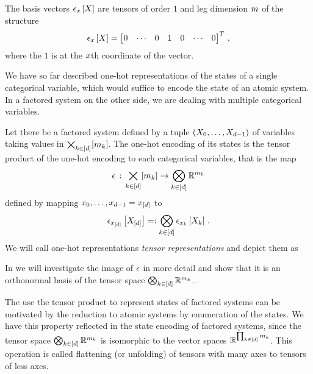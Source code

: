 The basis vectors $\epsilon_{x}\left[X\right]$ are tensors of order $1$ and leg dimension $m$ of the structure
\begin{align}
	\epsilon_{x}\left[X\right] = \begin{bmatrix}
	0 & \cdots & 0 & 1 & 0 & \cdots & 0
	\end{bmatrix}^T \, ,
\end{align}
where the $1$ is at the $x$th coordinate of the vector.

We have so far described one-hot representations of the states of a single categorical variable, which would suffice to encode the state of an atomic system.
In a factored system on the other side, we are dealing with multiple categorical variables.

\begin{definition}\label{def:oneHotEncoding}
	Let there be a factored system defined by a tuple $(X_{0},\ldots,X_{d-1})$ of variables taking values in $\bigtimes_{k\in[d]}[m_{k}]$.
	The one-hot encoding of its states is the tensor product of the one-hot encoding to each categorical variables, that is the map
		\[ \epsilon\,:\,\bigtimes_{k\in[d]}[m_{k}] \rightarrow  \bigotimes_{k\in[d]} \mathbb{R}^{m_{k}} \]
	defined by mapping $x_{0},\ldots,x_{d-1}=x_{[d]}$ to
	\begin{align*}
		 \epsilon_{x_{[d]}}\left[X_{[d]}\right]
		=: \bigotimes_{k\in[d]} \epsilon_{x_{k}}\left[X_{k}\right] \, .
	\end{align*}
	We will call one-hot representations \emph{tensor representations} and depict them as
	\begin{center}
		
	\end{center}
\end{definition}

In  we will investigate the image of $\epsilon$ in more detail and show that it is an orthonormal basis of the tensor space $\bigotimes_{k\in[d]} \mathbb{R}^{m_{k}}$.

\begin{remark}
	The use the tensor product to represent states of factored systems can be motivated by the reduction to atomic systems by enumeration of the states.
	We have this property reflected in the state encoding of factored systems, since the tensor space $\bigotimes_{k\in[d]} \mathbb{R}^{m_{k}}$ is isomorphic to the vector spaces $\mathbb{R}^{\prod_{k\in[d]}m_{k}}$.
	This operation is called flattening (or unfolding) of tensors with many axes to tensors of less axes.
\end{remark}

